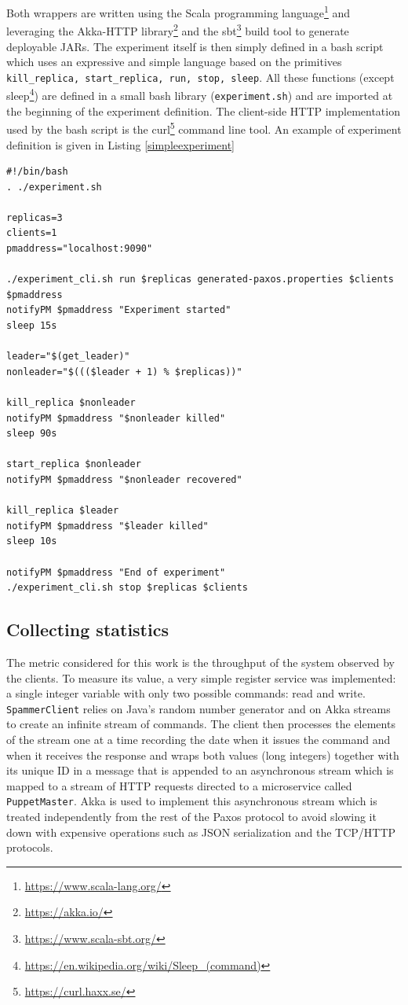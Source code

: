 \documentclass[a4paper, 10pt]{article}
\begin{document}
Both wrappers are written using the Scala programming language\footnote{\url{https://www.scala-lang.org/}} and leveraging the Akka-HTTP library\footnote{\url{https://akka.io/}} and the sbt\footnote{\url{https://www.scala-sbt.org/}} build tool to generate deployable JARs. The experiment itself is then simply defined in a bash script which uses an expressive and simple language based on the primitives \texttt{kill\_replica, start\_replica, run, stop, sleep}. All these functions (except sleep\footnote{\url{https://en.wikipedia.org/wiki/Sleep_(command)}}) are defined in a small bash library (\texttt{experiment.sh}) and are imported at the beginning of the experiment definition. The client-side HTTP implementation used by the bash script is the curl\footnote{\url{https://curl.haxx.se/}} command line tool. An example of experiment definition is given in Listing \ref{simpleexperiment}

\begin{lstlisting}[label=simpleexperiment, caption=Example of experiment definition file]
#!/bin/bash
. ./experiment.sh

replicas=3
clients=1
pmaddress="localhost:9090"

./experiment_cli.sh run $replicas generated-paxos.properties $clients $pmaddress
notifyPM $pmaddress "Experiment started"
sleep 15s

leader="$(get_leader)"
nonleader="$((($leader + 1) % $replicas))"

kill_replica $nonleader
notifyPM $pmaddress "$nonleader killed"
sleep 90s

start_replica $nonleader
notifyPM $pmaddress "$nonleader recovered"

kill_replica $leader
notifyPM $pmaddress "$leader killed"
sleep 10s

notifyPM $pmaddress "End of experiment"
./experiment_cli.sh stop $replicas $clients
\end{lstlisting}

\subsection{Collecting statistics}
The metric considered for this work is the throughput of the system observed by the clients. To measure its value, a very simple register service was implemented: a single integer variable with only two possible commands: read and write. \texttt{SpammerClient} relies on Java's random number generator and on Akka streams to create an infinite stream of commands. The client then processes the elements of the stream one at a time recording the date when it issues the command and when it receives the response and wraps both values (long integers) together with its unique ID in a message that is appended to an asynchronous stream which is mapped to a stream of HTTP requests directed to a microservice called \texttt{PuppetMaster}. Akka is used to implement this asynchronous stream which is treated independently from the rest of the Paxos protocol to avoid slowing it down with expensive operations such as JSON serialization and the TCP/HTTP protocols.
\end{document}
